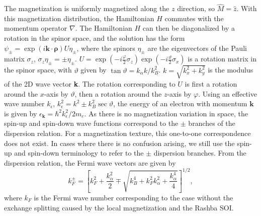 \documentclass[12pt]{iopart}
\begin{document}
The magnetization is uniformly magnetized along the $z$ direction, so $\hat {M} = \hat {z}$. With this magnetization distribution, the Hamiltonian $H$ commutes with the momentum operator $\nabla$. The Hamiltonian $H$ can then be diagonalized by a rotation in the spinor space, and the solution has the form $\psi_\pm = \exp ( i \textbf {k} \cdot \bm {\rho}) U \eta_\pm$, where the spinors $\eta _ \pm$ are the eigenvectors of the Pauli matrix $\sigma_z$, $\sigma_z \eta_ \pm = \pm \eta _\pm$. $U = \exp(- i \frac { \varphi } {2} \sigma_z ) \exp(- i \frac {\vartheta} {2} \sigma_x)$ is a rotation matrix in the spinor space, with $\vartheta$ given by $\tan \vartheta = k_\alpha k/ k_B^2$. $k = \sqrt{k _x^2 + k_y ^2}$ is the modulus of the 2D wave vector \textbf{k}. The rotation corresponding to $U$ is first a rotation around the $x$-axis by $\vartheta$, then a rotation around the $z$-axis by $\varphi$. Using an effective wave number $k_ \epsilon$, $k_ \epsilon ^2 = k^2 \pm k_B^2\sec \vartheta$, the energy of an electron with momentum $\textbf{k}$ is given by $\epsilon _\textbf{k} = \hbar^2 k_ \epsilon ^2/2 m_e$. As there is no magnetization variation in space, the spin-up and spin-down wave functions correspond to the $\pm$ branches of the dispersion relation. For a magnetization texture, this one-to-one correspondence does not exist. In cases where there is no confusion arising, we still use the spin-up and spin-down terminology to refer to the $\pm$ dispersion branches. From the dispersion relation, the Fermi wave vectors are given by
$$k_F ^ \pm = \left [ k_F^2 + \frac {k_ \alpha ^2} {2}  \mp \sqrt{ k_B^4 + k_F^2 k_ \alpha ^2 + \frac { k_ \alpha^4} {4}} \right ] ^ {1/2},$$
where $k_F$ is the Fermi wave number corresponding to the case without the exchange splitting caused by the local magnetization and the Rashba SOI.
\end{document}
